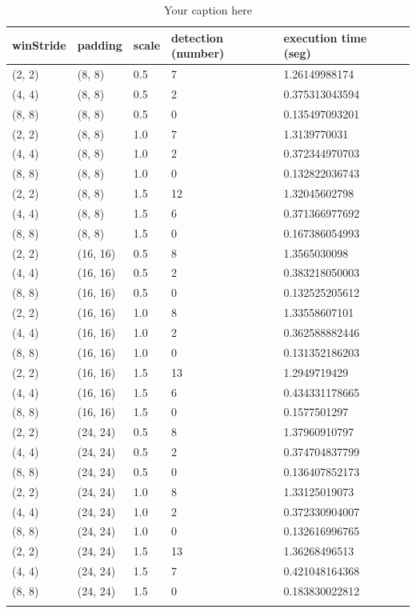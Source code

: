 \begin{longtable}{|l|l|l|l|l|l|} 
	\hline
	\textbf{winStride} & \textbf{padding} & \textbf{scale} & \textbf{detection (number)} & \textbf{execution time (seg)} \\ \hline
	(2, 2) & (8, 8) & 0.5 & 7 & 1.26149988174 \\ \hline
	(4, 4) & (8, 8) & 0.5 & 2 & 0.375313043594 \\ \hline
	(8, 8) & (8, 8) & 0.5 & 0 & 0.135497093201 \\ \hline
	(2, 2) & (8, 8) & 1.0 & 7 & 1.3139770031 \\ \hline
	(4, 4) & (8, 8) & 1.0 & 2 & 0.372344970703 \\ \hline
	(8, 8) & (8, 8) & 1.0 & 0 & 0.132822036743 \\ \hline
	(2, 2) & (8, 8) & 1.5 & 12 & 1.32045602798 \\ \hline
	(4, 4) & (8, 8) & 1.5 & 6 & 0.371366977692 \\ \hline
	(8, 8) & (8, 8) & 1.5 & 0 & 0.167386054993 \\ \hline
	(2, 2) & (16, 16) & 0.5 & 8 & 1.3565030098 \\ \hline
	(4, 4) & (16, 16) & 0.5 & 2 & 0.383218050003 \\ \hline
	(8, 8) & (16, 16) & 0.5 & 0 & 0.132525205612 \\ \hline
	(2, 2) & (16, 16) & 1.0 & 8 & 1.33558607101 \\ \hline
	(4, 4) & (16, 16) & 1.0 & 2 & 0.362588882446 \\ \hline
	(8, 8) & (16, 16) & 1.0 & 0 & 0.131352186203 \\ \hline
	(2, 2) & (16, 16) & 1.5 & 13 & 1.2949719429 \\ \hline
	(4, 4) & (16, 16) & 1.5 & 6 & 0.434331178665 \\ \hline
	(8, 8) & (16, 16) & 1.5 & 0 & 0.1577501297 \\ \hline
	(2, 2) & (24, 24) & 0.5 & 8 & 1.37960910797 \\ \hline
	(4, 4) & (24, 24) & 0.5 & 2 & 0.374704837799 \\ \hline
	(8, 8) & (24, 24) & 0.5 & 0 & 0.136407852173 \\ \hline
	(2, 2) & (24, 24) & 1.0 & 8 & 1.33125019073 \\ \hline
	(4, 4) & (24, 24) & 1.0 & 2 & 0.372330904007 \\ \hline
	(8, 8) & (24, 24) & 1.0 & 0 & 0.132616996765 \\ \hline
	(2, 2) & (24, 24) & 1.5 & 13 & 1.36268496513 \\ \hline
	(4, 4) & (24, 24) & 1.5 & 7 & 0.421048164368 \\ \hline
	(8, 8) & (24, 24) & 1.5 & 0 & 0.183830022812 \\ \hline

		
	\caption{Your caption here} %
	\label{tab:myfirstlongtable}
\end{longtable}


